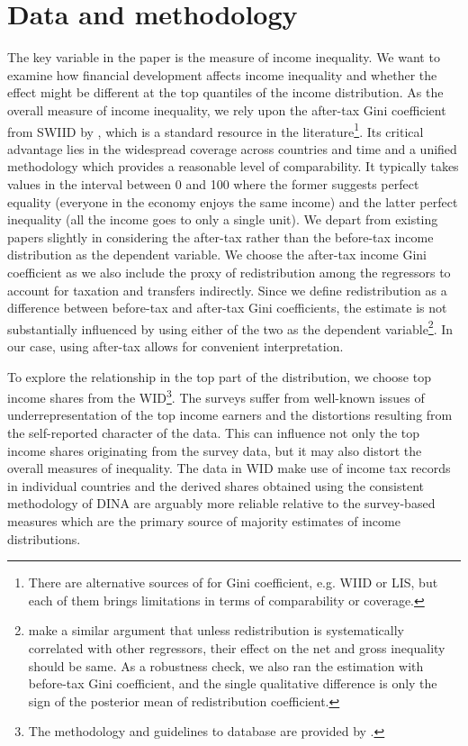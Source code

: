 \documentclass[preprint, nonatbib, 10pt]{elsarticle}
\begin{document}
%
%

\section{Data and methodology}
\label{sec:datameth}
The key variable in the paper is the measure of income inequality. We want to examine how financial development affects income inequality and whether the effect might be different at the top quantiles of the income distribution. As the overall measure of income inequality, we rely upon the after-tax Gini coefficient from \ac{SWIID} by \textcite{Solt2019}, which is a standard resource in the literature\footnote{There are alternative sources of for Gini coefficient, e.g. \ac{WIID} or \ac{LIS}, but each of them brings limitations in terms of comparability or coverage.}. Its critical advantage lies in the widespread coverage across countries and time and a unified methodology which provides a reasonable level of comparability. It typically takes values in the interval between 0 and 100 where the former suggests perfect equality (everyone in the economy enjoys the same income) and the latter perfect inequality (all the income goes to only a single unit). We depart from existing papers slightly in considering the after-tax rather than the before-tax income distribution as the dependent variable. We choose the after-tax income Gini coefficient as we also include the proxy of redistribution among the regressors to account for taxation and transfers indirectly. Since we define redistribution as a difference between before-tax and after-tax Gini coefficients, the estimate is not substantially influenced by using either of the two as the dependent variable\footnote{\textcite{furceri2019robust} make a similar argument that unless redistribution is systematically correlated with other regressors, their effect on the net and gross inequality should be same. As a robustness check, we also ran the estimation with before-tax Gini coefficient, and the single qualitative difference is only the sign of the posterior mean of redistribution coefficient.}. In our case, using after-tax allows for convenient interpretation.

To explore the relationship in the top part of the distribution, we choose top income shares from the \ac{WID}\footnote{The methodology and guidelines to database are provided by \textcite{alvaredo2016distributional}.}. The surveys suffer from well-known issues of underrepresentation of the top income earners and the distortions resulting from the self-reported character of the data. This can influence not only the top income shares originating from the survey data, but it may also distort the overall measures of inequality. The data in \ac{WID} make use of income tax records in individual countries and the derived shares obtained using the consistent methodology of \ac{DINA} are arguably more reliable relative to the survey-based measures which are the primary source of majority estimates of income distributions. 
\end{document}
